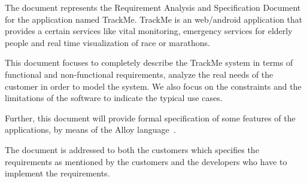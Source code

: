 The document represents the Requirement Analysis and Specification Document for the application named TrackMe. TrackMe is an web/android application that provides a certain services like vital monitoring, emergency services for elderly people and real time visualization of race or marathons. 

This document focuses to completely describe the TrackMe system in terms of functional and non-functional requirements, analyze the real needs of the customer in order to model the system. We also focus on the constraints and the limitations of the software to indicate the typical use cases. 

Further, this document will provide formal specification of some features of the applications, by means of the Alloy language~\cite{alloy-site}.

The document is addressed to both the customers which specifies the requirements as mentioned by the customers and the developers who have to implement the requirements.
